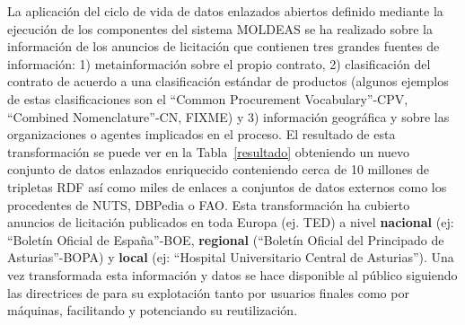 \documentclass[a4paper,final,11pt,fleqn,twoside]{book}  %
\begin{document}
La aplicación del ciclo de vida de datos enlazados abiertos definido mediante la ejecución de los componentes 
del sistema MOLDEAS se ha realizado sobre la información de los anuncios de licitación que contienen tres grandes 
fuentes de información: 1) metainformación sobre el propio contrato, 2) clasificación del contrato de acuerdo a una 
clasificación estándar de productos (algunos ejemplos de estas clasificaciones son el ``Common Procurement Vocabulary''-CPV, ``Combined Nomenclature''-CN, 
FIXME) y 3) información geográfica y sobre las organizaciones o agentes implicados en el proceso. El resultado de esta transformación 
se puede ver en la Tabla~\ref{resultado} obteniendo un nuevo conjunto de datos enlazados enriquecido conteniendo cerca de 10 millones 
de tripletas RDF así como miles de enlaces a conjuntos de datos externos como los procedentes de NUTS, DBPedia o FAO. Esta transformación 
ha cubierto anuncios de licitación publicados en toda Europa (ej. TED) a nivel \textbf{nacional} (ej: ``Boletín Oficial de España''-BOE, 
\textbf{regional} (``Boletín Oficial del Principado de Asturias''-BOPA) y \textbf{local} (ej: ``Hospital Universitario Central de Asturias''). Una 
vez transformada esta información y datos se hace disponible al público siguiendo las directrices de \lod para su explotación tanto 
por usuarios finales como por máquinas, facilitando y potenciando su reutilización.
\end{document}
